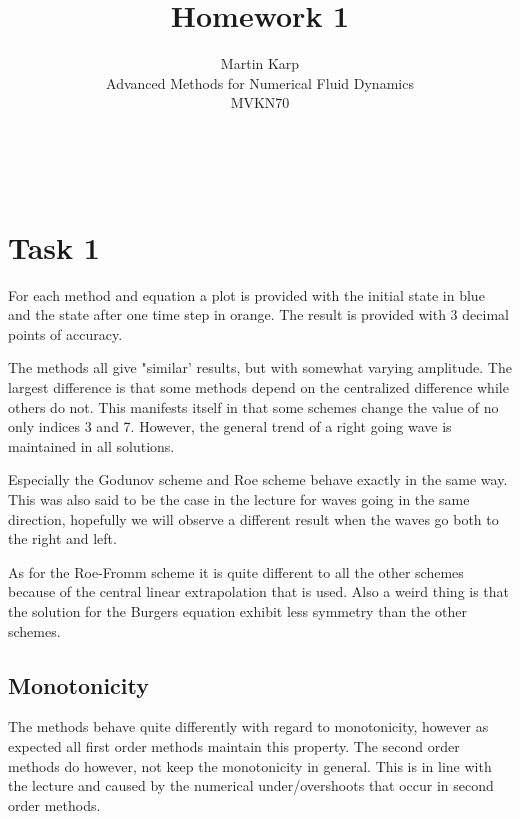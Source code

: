 \documentclass{article}
\title{Homework 1}
\author{Martin Karp\\Advanced Methods for Numerical Fluid Dynamics\\ MVKN70}
\makeatletter
\renewcommand*\maketitle{
  {
    \begin{center}
      {\huge\bfseries \@title}\\
      \vspace{5mm}
      {\large \@author}
    \end{center}
    \vspace{2mm}
  }
}
\makeatother
\begin{document}
\maketitle

\section*{Task 1}
For each method and equation a plot is provided with the initial state in blue and the state after one time step in orange. The result is provided with 3 decimal points of accuracy.

The methods all give "similar' results, but with somewhat varying amplitude. The largest difference is that some methods depend on the centralized difference while others do not. This manifests itself in that some schemes change the value of no only indices 3 and 7. However, the general trend of a right going wave is maintained in all solutions.

Especially the Godunov scheme and Roe scheme behave exactly in the same way. This was also said to be the case in the lecture for waves going in the same direction, hopefully we will observe a different result when the waves go both to the right and left.

As for the Roe-Fromm scheme it is quite different to all the other schemes because of the central linear extrapolation that is used.  Also a weird thing is that the solution for the Burgers equation exhibit less symmetry than the other schemes.

\subsection*{Monotonicity}
The methods behave quite differently with regard to monotonicity, however as expected all first order methods maintain this property. The second order methods do however, not keep the monotonicity in general. This is in line with the lecture and caused by the numerical under/overshoots that occur in second order methods.

\subsection*{}
\end{document}
